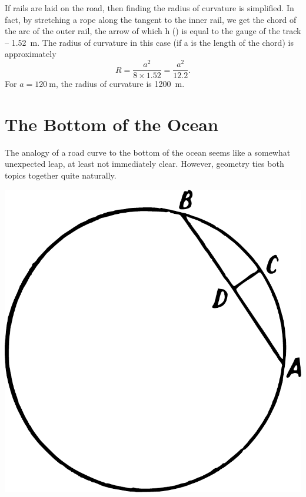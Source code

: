 If rails are laid on the road, then finding the radius of curvature is simplified. In fact, by stretching a rope along the tangent to the inner rail, we get the chord of the arc of the outer rail, the arrow of which h () is equal to the gauge of the track -- \SI{1.52}{\meter}. The radius of curvature in this case (if a is the length of the chord) is approximately
\begin{equation*}%
R = \frac{a^{2}}{8 \times 1.52} = \frac{a^{2}}{12.2}.
\end{equation*}
For $a = \SI{120}{\meter}$, the radius of curvature is \SI{1200}{\meter}.




\section{The Bottom of the Ocean}
\label{sec-4.8}

The analogy of a road curve to the bottom of the ocean seems like a somewhat unexpected leap, at least not immediately clear. However, geometry ties both topics together quite naturally.

\begin{marginfigure}%
\centering
\includegraphics[width=\textwidth]{figures/ch-04/fig-086.pdf}
\end{marginfigure}

